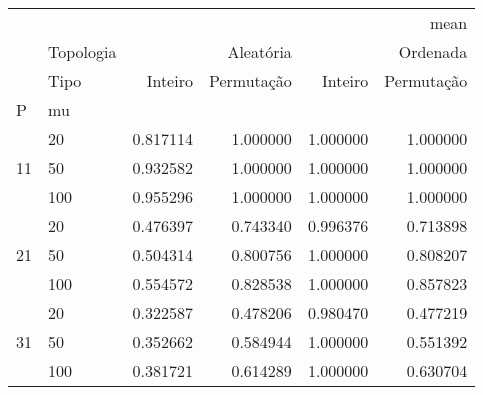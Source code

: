 \begin{tabular}{llrrrr}
\toprule
 &  & \multicolumn{4}{r}{mean} \\
 & Topologia & \multicolumn{2}{r}{Aleatória} & \multicolumn{2}{r}{Ordenada} \\
 & Tipo & Inteiro & Permutação & Inteiro & Permutação \\
P & mu &  &  &  &  \\
\midrule
\multirow[t]{3}{*}{11} & 20 & 0.817114 & 1.000000 & 1.000000 & 1.000000 \\
 & 50 & 0.932582 & 1.000000 & 1.000000 & 1.000000 \\
 & 100 & 0.955296 & 1.000000 & 1.000000 & 1.000000 \\
\cline{1-6}
\multirow[t]{3}{*}{21} & 20 & 0.476397 & 0.743340 & 0.996376 & 0.713898 \\
 & 50 & 0.504314 & 0.800756 & 1.000000 & 0.808207 \\
 & 100 & 0.554572 & 0.828538 & 1.000000 & 0.857823 \\
\cline{1-6}
\multirow[t]{3}{*}{31} & 20 & 0.322587 & 0.478206 & 0.980470 & 0.477219 \\
 & 50 & 0.352662 & 0.584944 & 1.000000 & 0.551392 \\
 & 100 & 0.381721 & 0.614289 & 1.000000 & 0.630704 \\
\cline{1-6}
\bottomrule
\end{tabular}
